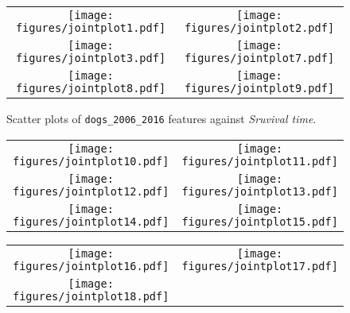 \documentclass[12pt]{report}
\begin{document}
\begin{figure}[hp]
  	\caption{Scatter plots of \texttt{dogs\_2006\_2016} features against \textit{Sruvival time}.}
	\begin{adjustwidth}{-1.5in}{-1in}
  	\centering
  	\vspace{0.5cm}
  	\label{jointplotsfig}
  	\begin{tabular}{cc}
  		\texttt{[image: figures/jointplot1.pdf]} & 
  		\texttt{[image: figures/jointplot2.pdf]} \\
		\texttt{[image: figures/jointplot3.pdf]} &
		\texttt{[image: figures/jointplot7.pdf]} \\
		\texttt{[image: figures/jointplot8.pdf]} & 
  		\texttt{[image: figures/jointplot9.pdf]} \\
  	\end{tabular}
  	\end{adjustwidth}
\end{figure}
\begin{figure}[hp]
	\begin{adjustwidth}{-1.5in}{-1in}
  	\centering
  	\begin{tabular}{cc}
		\texttt{[image: figures/jointplot10.pdf]} &
		\texttt{[image: figures/jointplot11.pdf]} \\
		\texttt{[image: figures/jointplot12.pdf]} &
		\texttt{[image: figures/jointplot13.pdf]} \\
		\texttt{[image: figures/jointplot14.pdf]} & 
  		\texttt{[image: figures/jointplot15.pdf]} \\
  	\end{tabular}
  	\end{adjustwidth}
\end{figure}
\begin{figure}[hp]
	\begin{adjustwidth}{-1.5in}{-1in}
  	\centering
  	\begin{tabular}{cc}
		\texttt{[image: figures/jointplot16.pdf]} &
		\texttt{[image: figures/jointplot17.pdf]} \\
		\texttt{[image: figures/jointplot18.pdf]}
  	\end{tabular}
  	\end{adjustwidth}
\end{figure}
\end{document}
